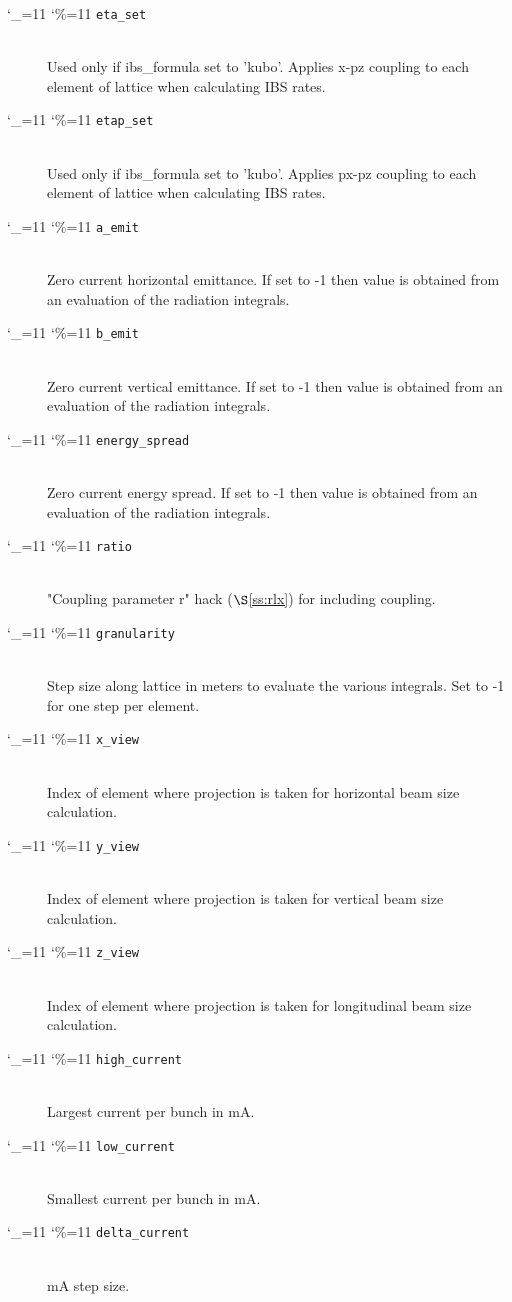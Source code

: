 \documentclass[11pt]{article}
\newcommand{\sref}[1]{$\S$\ref{#1}}
\newcommand\ttcmd{\begingroup\catcode`\_=11 \catcode`\%=11 \dottcmd}
\newcommand\dottcmd[1]{\texttt{#1}\endgroup}
\newcommand{\vn}{\ttcmd}
\newcommand{\Newline}{\hfil \\}
\begin{document}
\begin{description}
  \item[\vn{eta_set}] \Newline
Used only if ibs_formula set to 'kubo'.
Applies x-pz coupling to each
element of lattice when calculating IBS rates.

  \item[\vn{etap_set}] \Newline
Used only if ibs_formula set to 'kubo'. Applies px-pz coupling to
each element of lattice when calculating IBS rates.

  \item[\vn{a_emit}] \Newline
Zero current horizontal emittance. If set to -1 then value is 
obtained from an evaluation of the radiation integrals.

  \item[\vn{b_emit}] \Newline
Zero current vertical emittance. If set to -1 then value is 
obtained from an evaluation of the radiation integrals.

  \item[\vn{energy_spread}] \Newline
Zero current energy spread. If set to -1 then value is 
obtained from an evaluation of the radiation integrals.

  \item[\vn{ratio}] \Newline
"Coupling parameter r" hack (\sref{ss:rlx}) for including coupling.

  \item[\vn{granularity}] \Newline
Step size along lattice in meters to evaluate the various 
integrals.  Set to -1 for one step per element.

  \item[\vn{x_view}] \Newline
Index of element where projection is taken for horizontal beam size
calculation.

  \item[\vn{y_view}] \Newline
Index of element where projection is taken for vertical beam size
calculation.

  \item[\vn{z_view}] \Newline
Index of element where projection is taken for longitudinal beam size
calculation.

  \item[\vn{high_current}] \Newline
Largest current per bunch in mA.

  \item[\vn{low_current}] \Newline
Smallest current per bunch in mA.

  \item[\vn{delta_current}] \Newline
mA step size.

  \end{description}
\end{document}
